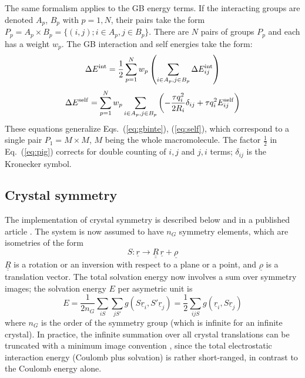 \documentclass[12pt]{report}
\newcommand{\und}{\underline}
\begin{document}
The same formalism applies to the GB energy terms. If the interacting groups are denoted
$A_p$, $B_p$ with $p=1,N$, their pairs take the form $P_p = A_p \times B_p = 
\{(i,j); i \in A_p, j \in B_p\}$. There are $N$ pairs of groups $P_p$ and each has a
weight $w_p$. The GB interaction and self energies take the form:
\begin{equation} \label{eq:pig}
\Delta E^{\rm int} = \frac{1}{2} \sum_{p=1}^N w_p \left( \sum_{i \in A_p, j \in B_p}
 \Delta E^{\rm int}_{ij} \right)
\end{equation}
\begin{equation} 
\Delta E^{\rm self} = \sum_{p=1}^N w_p \sum_{i \in A_p, j \in B_p}
\left( -\frac{\tau q_i^2}{2 R_i}\delta_{ij} + \tau q_i^2 E_{ij}^{\rm self} \right)
\end{equation}
These equations generalize Eqs.\ (\ref{eq:gbinte}), (\ref{eq:self}), which correspond
to a single pair $P_1 = M \times M$, $M$ being the whole macromolecule. The factor
$\frac{1}{2}$ in Eq.\ (\ref{eq:pig}) corrects for double counting of $i,j$ and $j,i$
terms; $\delta_{ij}$ is the Kronecker symbol.

\subsection{Crystal symmetry}
The implementation of crystal symmetry is described below and in a published article \cite{Moulinier03}.
The system is now assumed to have $n_G$ symmetry elements, which are isometries of the form
\begin{equation}
S: \und{r} \rightarrow \und{\und{R}} \, \und{r} + \und{\rho}
\end{equation}
$\und{\und{R}}$ is a rotation or an inversion with respect to a plane or a point, and $\und{\rho}$
is a translation vector. The total solvation energy now involves a sum over symmetry images; the solvation
energy $E$ per asymetric unit is
\begin{equation} 
E = \frac{1}{2n_G} \sum_{iS} \sum_{jS'} g(S\und{r}_i, S'\und{r}_j)
  = \frac{1}{2} \sum_{ijS} g(\und{r}_i,S\und{r}_j)
\end{equation}
where $n_G$ is the order of the symmetry group (which is infinite for an infinite crystal). 
In practice, the infinite summation over all crystal translations can be truncated with
a minimum image convention \cite{AllenBK}, since the total electrostatic interaction energy
(Coulomb plus solvation) is rather short-ranged, in contrast to the Coulomb energy alone.
\end{document}
